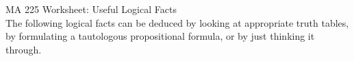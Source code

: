 \documentclass[11pt]{letter}  %
\begin{document}
\pagestyle{empty} %



{\Large MA 225 Worksheet: Useful Logical Facts}\\ %


The following logical facts can be deduced by looking at appropriate truth tables,  by formulating a tautologous propositional formula, or by just thinking it through.
\begin{center}
\end{center}
\end{document}
